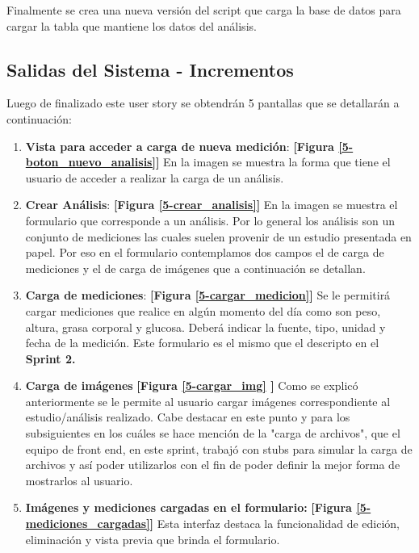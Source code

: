 	Finalmente se crea una nueva versión del script que carga la base de datos para cargar la tabla que mantiene los datos del análisis.

\clearpage
\subsection {Salidas del Sistema - Incrementos}

Luego de finalizado este user story se obtendrán 5 pantallas que se detallarán a continuación:
\begin{enumerate}
	\item \textbf{Vista para acceder a carga de nueva medición}: \textbf{[Figura \ref{5-boton_nuevo_analisis}]} En la imagen se muestra la forma que tiene el usuario de acceder  a realizar la carga de un análisis.
    	\item \textbf{Crear Análisis}: \textbf{[Figura \ref{5-crear_analisis}]} En la imagen se muestra el formulario que corresponde a un análisis. Por lo general los análisis son un conjunto de mediciones las cuales suelen provenir de un estudio presentada en papel. Por eso en el formulario contemplamos dos campos el de carga de mediciones y el de carga de imágenes que a continuación se detallan.
        	\item \textbf{Carga de mediciones}: \textbf{[Figura \ref{5-cargar_medicion}]} Se le permitirá cargar mediciones que realice en algún momento del día como son peso, altura, grasa corporal y glucosa. Deberá indicar la fuente, tipo, unidad y fecha de la medición. Este formulario es el mismo que el descripto en el\textbf{ Sprint 2.}
    \item \textbf{Carga de imágenes}  \textbf{[Figura  \ref{5-cargar_img} ]} Como se explicó anteriormente se le permite al usuario cargar imágenes correspondiente al estudio/análisis realizado. Cabe destacar en este punto y para los subsiguientes en los cuáles se hace mención de la "carga de archivos",  que el equipo de front end, en este sprint, trabajó con stubs para simular la carga de archivos y así poder utilizarlos con el fin de poder definir la mejor forma de mostrarlos al usuario.

    \item \textbf{Imágenes y mediciones cargadas en el formulario:}  \textbf{[Figura \ref{5-mediciones_cargadas}]} Esta interfaz destaca la funcionalidad de edición, eliminación y vista previa que brinda el formulario.

\end{enumerate}

